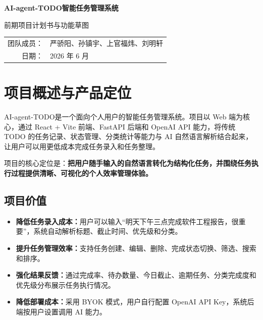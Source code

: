\documentclass[UTF8,a4paper,12pt,fontset=fandol]{ctexart}
\newcommand{\product}{AI-agent-TODO}
\begin{document}
\begin{titlepage}
  \centering
  \vspace*{1.4cm}
  {\Huge\bfseries \product 智能任务管理系统\par}
  \vspace{0.6cm}
  {\LARGE 前期项目计划书与功能草图\par}
  \vspace{2.4cm}

  \vfill
  \begin{tabular}{rl}
    团队成员： & 严骄阳、孙镇宇、上官福炜、刘明轩 \\
    日期： & 2026 年 6 月 \\
  \end{tabular}
  \vspace*{1.2cm}
\end{titlepage}

\tableofcontents
\newpage

\section{项目概述与产品定位}

\begin{summarybox}
\product 是一个面向个人用户的智能任务管理系统。项目以 Web 端为核心，通过 React + Vite 前端、FastAPI 后端和 OpenAI API 能力，将传统 TODO 的任务记录、状态管理、分类统计等能力与 AI 自然语言解析结合起来，让用户可以用更低成本完成任务录入和任务整理。

项目的核心定位是：\textbf{把用户随手输入的自然语言转化为结构化任务，并围绕任务执行过程提供清晰、可视化的个人效率管理体验。}
\end{summarybox}

\subsection{项目价值}

\begin{itemize}
  \item \textbf{降低任务录入成本：}用户可以输入“明天下午三点完成软件工程报告，很重要”，系统自动解析标题、截止时间、优先级和分类。
  \item \textbf{提升任务管理效率：}支持任务创建、编辑、删除、完成状态切换、筛选、搜索和排序。
  \item \textbf{强化结果反馈：}通过完成率、待办数量、今日截止、逾期任务、分类完成度和优先级分布展示任务执行情况。
  \item \textbf{降低部署成本：}采用 BYOK 模式，用户自行配置 OpenAI API Key，系统后端按用户设置调用 AI 能力。
\end{itemize}
\end{document}

